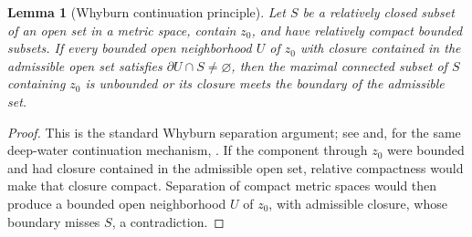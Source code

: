 \documentclass[11pt,reqno]{amsart}
\numberwithin{equation}{section}
\newtheorem{lemma}[theorem]{Lemma}
\theoremstyle{definition}
\theoremstyle{remark}
\begin{document}
\begin{lemma}[Whyburn continuation principle]
\label{thm5.1}
Let $S$ be a relatively closed subset of an open set in a metric
space, contain $z_0$, and have relatively compact bounded subsets.  If
every bounded open neighborhood $U$ of $z_0$ with closure contained in
the admissible open set satisfies $\partial U\cap S\ne\varnothing$,
then the maximal connected subset of $S$ containing $z_0$ is unbounded
or its closure meets the boundary of the admissible set.
\end{lemma}
\begin{proof}
This is the standard Whyburn separation argument; see
\cite[Theorem A6]{AT81} and, for the same deep-water continuation
mechanism, \cite{Hur11}.  If the component through $z_0$ were bounded
and had closure contained in the admissible open set, relative
compactness would make that closure compact.  Separation of compact
metric spaces would then produce a bounded open neighborhood $U$ of
$z_0$, with admissible closure, whose boundary misses $S$, a
contradiction.
\end{proof}
\end{document}
